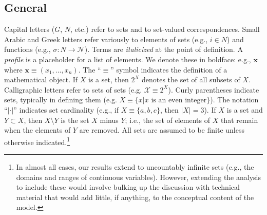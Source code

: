 \documentclass[
11pt,
titlepage,
reqno,
]{article}%
\theoremstyle{definition}
\begin{document}
\subsection{General}
Capital letters ($G$, $N$, etc.) refer to sets and to set-valued correspondences.  
Small Arabic and Greek letters refer variously to elements of sets (e.g., $i\in N$) and functions (e.g., $\sigma:N\rightarrow \mathcal{N}$). 
Terms  are \textit{italicized} at the point of definition.  
A \textit{profile} is a placeholder for a list of elements.
We denote these in boldface: e.g., $\mathbf{x}$ where $\mathbf{x}\equiv(x_1,\ldots,x_n)$. 
The ``$\equiv$'' symbol indicates the definition of a mathematical object. 
If $X$ is a set, then $2^X$ denotes the set of all subsets of $X$. Calligraphic letters refer to sets of sets (e.g. $\mathcal{X}\equiv 2^X$). 
Curly parentheses indicate sets, typically in defining them (e.g. $X\equiv\{x|x\text{ is an even integer}\}$). 
The notation ``$|\cdot|$'' indicates set cardinality (e.g., if $X\equiv\{a,b,c\}$, then $|X|=3$). 
If $X$ is a set and $Y\subset X$, then $X\setminus Y$ is the set $X$ minus $Y$; i.e., the set of elements of $X$ that  remain when the elements of $Y$ are removed. 
All sets are assumed to be finite unless otherwise indicated.\footnote
{
	In almost all cases, our results extend to uncountably infinite sets (e.g., the domains and ranges of continuous variables). However, extending the analysis to include these would involve bulking up the discussion with technical material that would add little, if anything, to the conceptual content of the model.
}


\pagebreak
\end{document}
